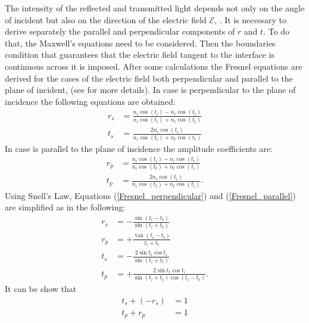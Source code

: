 The intensity of the reflected and transmitted light depends not only on the angle of incident but also on the direction of the electric field $\boldsymbol{\mathcal{E}}$, 
\cite{feynman1964feynman}.
It is necessary to derive separately the parallel and perpendicular components of $r$ and $t$. 
To do that, the Maxwell's equations need to be considered. 
Then the boundaries condition that guarantees that the electric field  tangent to the interface is continuous across it is imposed. 
After some calculations the Fresnel equations are derived for the cases of the electric field both perpendicular and parallel to the plane of incident, (see  \cite{born2013principles, hecht1998hecht} for more details). In case  is perpendicular to the plane of incidence the following equations are obtained:
\begin{equation} \label{Fresnel_perpendicular}
\begin{split}
r_{s} & = \frac{n_i\cos(t_i)-n_t \cos(t_t)}{n_i \cos(t_i)+n_t\cos(t_t)}\\
t_{s} & =  \frac{2n_i\cos(t_i)}{n_i\cos(t_i)+n_t\cos(t_t)}
\end{split}
\end{equation}
In case  is parallel to the plane of incidence the amplitude coefficients are:
\begin{equation}\label{Fresnel_parallel}
\begin{split}
r_{p} & = \frac{n_t\cos(t_i)-n_i \cos(t_t)}{n_i \cos(t_t)+n_t\cos(t_i)}\\
t_{p} & =  \frac{2n_i\cos(t_i)}{n_i\cos(t_t)+n_t\cos(t_i)}.
\end{split}
\end{equation}
Using Snell's Law,  Equations (\ref{Fresnel_perpendicular}) and (\ref{Fresnel_parallel}) are simplified as in the following:
\begin{equation} \label{simple_Fresnel}
\begin{split}
r_{s} & = -\frac{\sin(t_i-t_t)}{\sin(t_i+t_t)}\\
r_{p} & =  +\frac{\tan(t_i-t_t)}{t_i+t_t}\\
t_{s} & = -\frac{2\sin t_t \cos t_i}{\sin(t_i+t_t)}\\
t_{p} & = +\frac{2\sin t_t \cos t_i}{\sin(t_i+t_t)\cos(t_i- t_t)}.
\end{split}
\end{equation}
It can be show that
 \begin{equation}
\begin{split}
t_s+(-r_s) &= 1 \\
t_p+r_p &=  1
\end{split}
\end{equation}
